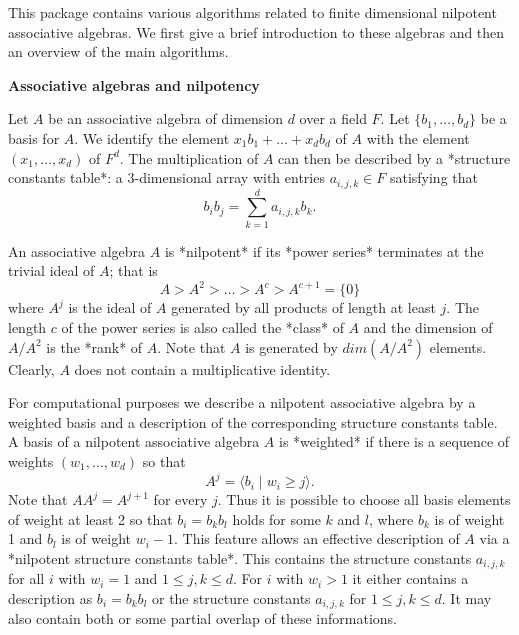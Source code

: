 

This package contains various algorithms related to finite dimensional 
nilpotent associative algebras. We first give a brief introduction to 
these algebras and then an overview of the main algorithms.
\medskip

{\bf Associative algebras and nilpotency}

Let $A$ be an associative algebra of dimension $d$ over a field $F$.
Let $\{b_1, \ldots, b_d\}$ be a basis for $A$. We identify the 
element $x_1 b_1 + \ldots + x_d b_d$ of $A$ with the element 
$(x_1, \ldots, x_d)$ of $F^d$. The multiplication of $A$ can then 
be described by a *structure constants table*: a 3-dimensional array 
with entries $a_{i,j,k} \in F$ satisfying that
$$b_i b_j = \sum_{k=1}^d a_{i,j,k} b_k.$$
\medskip

An associative algebra $A$ is *nilpotent* if its *power series* terminates
at the trivial ideal of $A$; that is
$$ A > A^2 > \ldots > A^c > A^{c+1} = \{0\} $$
where $A^j$ is the ideal of $A$ generated by all products of length 
at least $j$. The length $c$ of the power series is also called the 
*class* of $A$ and the dimension of $A/A^2$ is the *rank* of $A$. Note
that $A$ is generated by $dim(A/A^2)$ elements. Clearly, $A$ does not 
contain a multiplicative identity. 
\medskip

For computational purposes we describe a nilpotent associative algebra by 
a weighted basis and a description of the corresponding structure constants 
table. A basis of a nilpotent associative algebra $A$ is *weighted* if
there is a sequence of weights $(w_1, \ldots, w_d)$ so that
$$A^j = \langle b_i \mid w_i \geq j \rangle.$$
Note that $A A^j = A^{j+1}$ for every $j$. Thus it is possible to choose
all basis elements of weight at least 2 so that $b_i = b_k b_l$ holds for
some $k$ and $l$, where $b_k$ is of weight 1 and $b_l$ is of weight $w_i-1$. 
This feature allows an effective description of $A$ via a *nilpotent 
structure constants table*. This contains the structure constants 
$a_{i,j,k}$ for all $i$ with $w_i = 1$ and $1 \leq j,k \leq d$. For $i$ 
with $w_i > 1$ it either contains a description as $b_i = b_k b_l$ or the 
structure constants $a_{i,j,k}$ for $1 \leq j,k \leq d$. It may also 
contain both or some partial overlap of these informations.
\medskip

